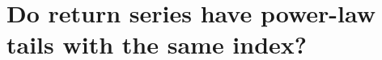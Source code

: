 \chapter[Do return series have power-law tails with the same
  index?]{{\huge Do return series have power-law tails with the same
    index?}}
\label{ch:extremes}

